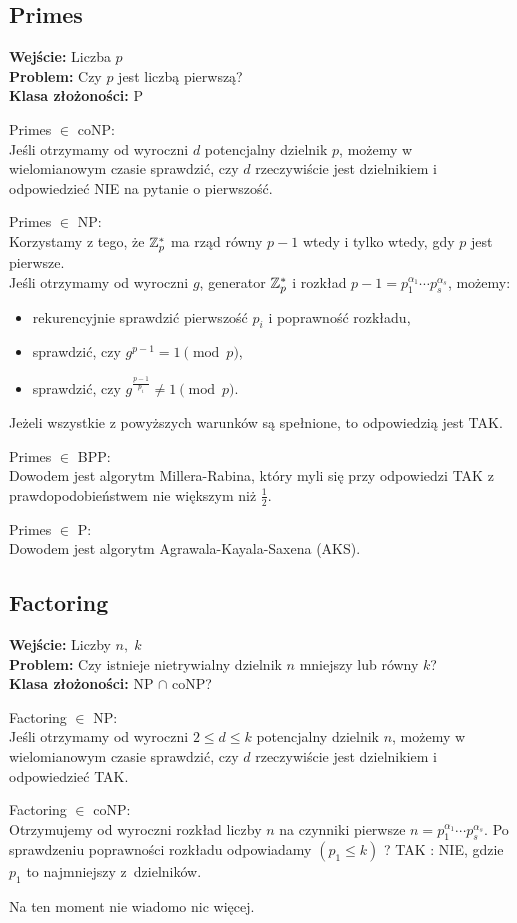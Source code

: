 \subsection{Primes}
\textbf{Wejście:} Liczba \( p \) \\
\textbf{Problem:} Czy \( p \) jest liczbą pierwszą? \\
\textbf{Klasa złożoności:} P

Primes \( \in \) coNP: \\
Jeśli otrzymamy od wyroczni \( d \) potencjalny dzielnik \( p \), możemy w wielomianowym czasie sprawdzić, czy \( d \) rzeczywiście jest dzielnikiem i odpowiedzieć NIE na pytanie o pierwszość.

Primes \( \in \) NP: \\
Korzystamy z tego, że \( \mathbb{Z}_p^* \) ma rząd równy \( p-1 \) wtedy i tylko wtedy, gdy \( p \) jest pierwsze. \\
Jeśli otrzymamy od wyroczni \( g \), generator \( \mathbb{Z}_p^* \) i rozkład \( p-1 = p_1^{\alpha_1} \cdots p_s^{\alpha_s} \), możemy:
\begin{itemize}
	\item rekurencyjnie sprawdzić pierwszość \( p_i \) i poprawność rozkładu,
	\item sprawdzić, czy \( g^{p-1} = 1 \pmod{p} \),
	\item sprawdzić, czy \( g^{\frac{p-1}{p_i}} \neq 1 \pmod{p} \).
\end{itemize}
Jeżeli wszystkie z powyższych warunków są spełnione, to odpowiedzią jest TAK.

\newpage
Primes \( \in \) BPP: \\
Dowodem jest algorytm Millera-Rabina, który myli się przy odpowiedzi TAK z prawdopodobieństwem nie większym niż \( \frac{1}{2} \).

Primes \( \in \) P: \\
Dowodem jest algorytm Agrawala-Kayala-Saxena (AKS).

\subsection{Factoring}
\textbf{Wejście:} Liczby \( n,\; k \) \\
\textbf{Problem:} Czy istnieje nietrywialny dzielnik \( n \) mniejszy lub równy \( k \)? \\
\textbf{Klasa złożoności:} NP \( \cap \) coNP?

Factoring \( \in \) NP: \\
Jeśli otrzymamy od wyroczni \( 2 \leq d \leq k \) potencjalny dzielnik \( n \), możemy w wielomianowym czasie sprawdzić, czy \( d \) rzeczywiście jest dzielnikiem i odpowiedzieć TAK.

Factoring \( \in \) coNP: \\
Otrzymujemy od wyroczni rozkład liczby \( n \) na czynniki pierwsze \( n = p_1^{\alpha_1} \cdots p_s^{\alpha_s} \). Po sprawdzeniu poprawności rozkładu odpowiadamy \( (p_1 \leq k) \) ? TAK : NIE, gdzie \( p_1 \) to najmniejszy z~dzielników.

Na ten moment nie wiadomo nic więcej.
